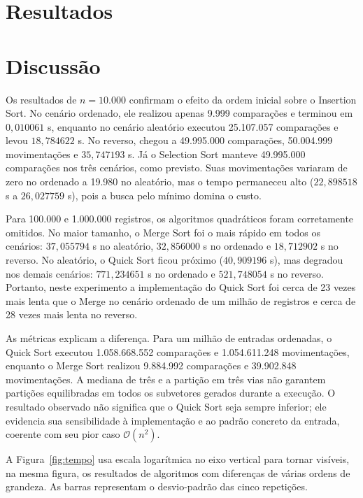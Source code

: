 \documentclass[12pt]{article}
\begin{document}
\section{Resultados}



\section{Discussão}

Os resultados de $n=10.000$ confirmam o efeito da ordem inicial sobre o
Insertion Sort. No cenário ordenado, ele realizou apenas 9.999 comparações e
terminou em $0,010061$ s, enquanto no cenário aleatório executou 25.107.057
comparações e levou $18,784622$ s. No reverso, chegou a 49.995.000 comparações,
50.004.999 movimentações e $35,747193$ s. Já o Selection Sort manteve
49.995.000 comparações nos três cenários, como previsto. Suas movimentações
variaram de zero no ordenado a 19.980 no aleatório, mas o tempo permaneceu alto
($22,898518$ s a $26,027759$ s), pois a busca pelo mínimo domina o custo.

Para 100.000 e 1.000.000 registros, os algoritmos quadráticos foram
corretamente omitidos. No maior tamanho, o Merge Sort foi o mais rápido em
todos os cenários: $37,055794$ s no aleatório, $32,856000$ s no ordenado e
$18,712902$ s no reverso. No aleatório, o Quick Sort ficou próximo
($40,909196$ s), mas degradou nos demais cenários: $771,234651$ s no ordenado
e $521,748054$ s no reverso. Portanto, neste experimento a implementação do
Quick Sort foi cerca de 23 vezes mais lenta que o Merge no cenário ordenado de
um milhão de registros e cerca de 28 vezes mais lenta no reverso.

As métricas explicam a diferença. Para um milhão de entradas ordenadas, o Quick
Sort executou 1.058.668.552 comparações e 1.054.611.248 movimentações, enquanto
o Merge Sort realizou 9.884.992 comparações e 39.902.848 movimentações. A
mediana de três e a partição em três vias não garantem partições equilibradas
em todos os subvetores gerados durante a execução. O resultado observado não
significa que o Quick Sort seja sempre inferior; ele evidencia sua sensibilidade
à implementação e ao padrão concreto da entrada, coerente com seu pior caso
$\mathcal{O}(n^2)$.

A Figura~\ref{fig:tempo} usa escala logarítmica no eixo vertical para tornar
visíveis, na mesma figura, os resultados de algoritmos com diferenças de várias
ordens de grandeza. As barras representam o desvio-padrão das cinco repetições.
\end{document}

